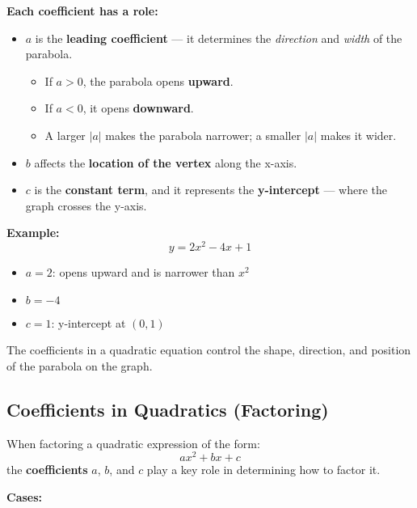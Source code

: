 \documentclass[11pt]{article}
\begin{document}
\textbf{Each coefficient has a role:}
\begin{itemize}
  \item \( a \) is the \textbf{leading coefficient} — it determines the \emph{direction} and \emph{width} of the parabola.
    \begin{itemize}
      \item If \( a > 0 \), the parabola opens \textbf{upward}.
      \item If \( a < 0 \), it opens \textbf{downward}.
      \item A larger \(|a|\) makes the parabola narrower; a smaller \(|a|\) makes it wider.
    \end{itemize}
  \item \( b \) affects the \textbf{location of the vertex} along the x-axis.
  \item \( c \) is the \textbf{constant term}, and it represents the \textbf{y-intercept} — where the graph crosses the y-axis.
\end{itemize}

\medskip

\textbf{Example:}
\[
y = 2x^2 - 4x + 1
\]
\begin{itemize}
  \item \( a = 2 \): opens upward and is narrower than \( x^2 \)
  \item \( b = -4 \)
  \item \( c = 1 \): y-intercept at \( (0, 1) \)
\end{itemize}

\begin{tcolorbox}[colback=yellow!5!white, colframe=yellow!80!black, title=Summary]
The coefficients in a quadratic equation control the shape, direction, and position of the parabola on the graph.
\end{tcolorbox}

\subsection{Coefficients in Quadratics (Factoring)}

When factoring a quadratic expression of the form:
\[
ax^2 + bx + c
\]
the \textbf{coefficients} \( a \), \( b \), and \( c \) play a key role in determining how to factor it.

\medskip

\textbf{Cases:}
\end{document}
